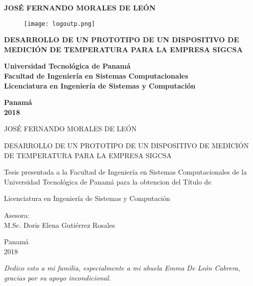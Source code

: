 \thispagestyle{empty}
\begin{center}
	
	\large
	
	\textbf{JOSÉ FERNANDO MORALES DE LEÓN}
	
	\vfill
	
	\begin{figure}[H]
		\centering
		\texttt{[image: logoutp.png]}
	\end{figure}

	\vfill
	
	\textbf{DESARROLLO DE UN PROTOTIPO DE UN DISPOSITIVO DE
	MEDICIÓN DE TEMPERATURA PARA LA EMPRESA SIGCSA}
	
	\vfill
	
	\textbf{Universidad Tecnológica de Panamá \\
	Facultad de Ingeniería en Sistemas Computacionales \\
	Licenciatura en Ingeniería de Sistemas y Computación}
	
	\vfill
	
	\textbf{Panamá\\
	2018}
		
\end{center}
\clearpage

\thispagestyle{empty}

\begin{center}

\large
JOSÉ FERNANDO MORALES DE LEÓN

\vfill

DESARROLLO DE UN PROTOTIPO DE UN DISPOSITIVO DE
MEDICIÓN DE TEMPERATURA PARA LA EMPRESA SIGCSA

\vfill

Tesis presentada a la Facultad de Ingeniería en Sistemas
Computacionales de la Universidad Tecnológica de Panamá
para la obtencion del Título de

\vfill

Licenciatura en Ingeniería de Sistemas y Computación

\vfill

Asesora:\\
M.Sc. Doris Elena Gutiérrez Rosales

\vfill
Panamá\\
2018

\end{center}

\clearpage

\thispagestyle{plain}

\begin{flushright}
	\vspace*{\fill}
	
	\textit{Dedico esto a mi familia, especialmente a mi abuela Emma De León Cabrera, gracias por su apoyo incondicional.}
	
	\vspace*{\fill}
\end{flushright}


